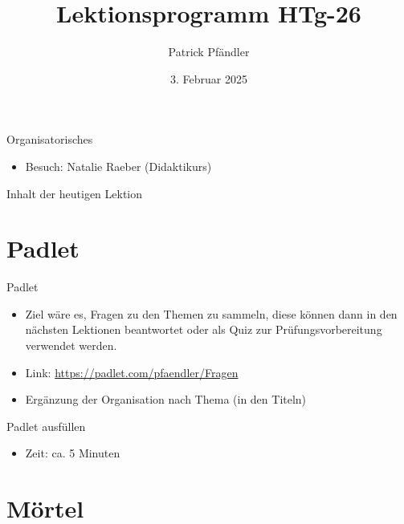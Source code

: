 



\title{\textbf{Lektionsprogramm HTg-26}}
\author{Patrick Pfändler}
\date{3. Februar   2025}




\frame{\titlepage}

\begin{frame}{Organisatorisches}
    \begin{itemize}
        \item[\textbullet] Besuch: Natalie Raeber (Didaktikurs)
    \end{itemize}

\end{frame}

\folieFragen


\begin{frame}{Inhalt der heutigen Lektion}
    \tableofcontents
\end{frame}


\section{Padlet}
\BlueSectionSlide
\begin{frame}{Padlet}
    \begin{itemize}
        \item[\textbullet] Ziel wäre es, Fragen zu den Themen zu sammeln, diese können dann in den nächsten Lektionen beantwortet oder als Quiz zur Prüfungsvorbereitung verwendet werden.
        \item[\textbullet] Link: \url{https://padlet.com/pfaendler/Fragen}
        \item[\textbullet] Ergänzung der Organisation nach Thema (in den Titeln)
    \end{itemize}
\end{frame}


\begin{frame}{Padlet ausfüllen}

    \begin{itemize}
        \item Zeit: ca. 5 Minuten
    \end{itemize}

\end{frame}


\section{Mörtel}
\BlueSectionSlide
